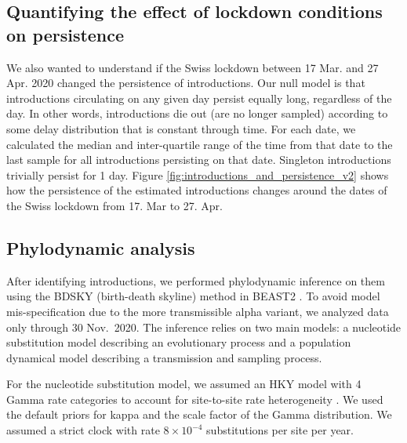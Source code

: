 \documentclass[9pt,twoside,lineno]{pnas-new}
\begin{document}
\subsection{Quantifying the effect of lockdown conditions on persistence}
We also wanted to understand if the Swiss lockdown between 17 Mar. and 27 Apr. 2020 changed the persistence of introductions. Our null model is that introductions circulating on any given day persist equally long, regardless of the day. In other words, introductions die out (are no longer sampled) according to some delay distribution that is constant through time. For each date, we calculated the median and inter-quartile range of the time from that date to the last sample for all introductions persisting on that date. Singleton introductions trivially persist for 1 day. Figure \ref{fig:introductions_and_persistence_v2} shows how the persistence of the estimated introductions changes around the dates of the Swiss lockdown from 17. Mar to 27. Apr.

\subsection*{Phylodynamic analysis}

After identifying introductions, we performed phylodynamic inference on them using the BDSKY (birth-death skyline) method \cite{stadler2013birth} in BEAST2 \cite{Bouckaert2019}. To avoid model mis-specification due to the more transmissible alpha variant, we analyzed data only through 30 Nov.~2020.  The inference relies on two main models: a nucleotide substitution model describing an evolutionary process and a population dynamical model describing a transmission and sampling process. 

For the nucleotide substitution model, we assumed an HKY \cite{Hasegawa1985} model with 4 Gamma rate categories to account for site-to-site rate heterogeneity \cite{Yang1994}. We used the default priors for kappa and the scale factor of the Gamma distribution. We assumed a strict clock with rate $8\times 10^{-4}$ substitutions per site per year.
\end{document}
